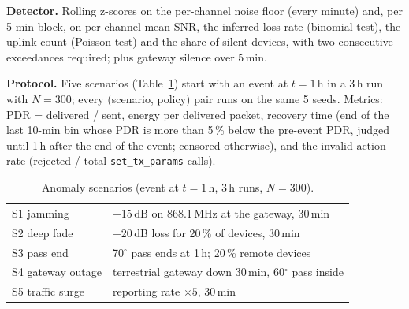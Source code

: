 \textbf{Detector.} Rolling z-scores on the per-channel noise floor (every minute) and, per 5-min
block, on per-channel mean SNR, the inferred loss rate (binomial test), the uplink count (Poisson
test) and the share of silent devices, with two consecutive exceedances required; plus gateway
silence over 5\,min.

\textbf{Protocol.} Five scenarios (Table~\ref{tab:scen}) start with an event at $t=1$\,h in a 3\,h
run with $N=300$; every (scenario, policy) pair runs on the same 5 seeds. Metrics: PDR = delivered /
sent, energy per delivered packet, recovery time (end of the last 10-min bin whose PDR is more than
5\,\% below the pre-event PDR, judged until 1\,h after the end of the event; censored otherwise),
and the
invalid-action rate (rejected / total \texttt{set\_tx\_params} calls).

\begin{table}[t]
\caption{Anomaly scenarios (event at $t=1$\,h, 3\,h runs, $N=300$).}
\label{tab:scen}
\centering\small
\begin{tabular}{@{}ll@{}}
\toprule
S1 jamming & +15\,dB on 868.1\,MHz at the gateway, 30\,min\\
S2 deep fade & +20\,dB loss for 20\,\% of devices, 30\,min\\
S3 pass end & 70$^\circ$ pass ends at 1\,h; 20\,\% remote devices\\
S4 gateway outage & terrestrial gateway down 30\,min, 60$^\circ$ pass inside\\
S5 traffic surge & reporting rate $\times5$, 30\,min\\
\bottomrule
\end{tabular}
\end{table}
